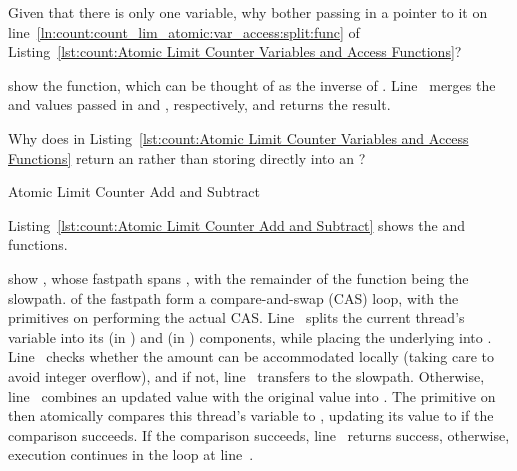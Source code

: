 \QuickQuiz{}
	Given that there is only one  variable,
	why bother passing in a pointer to it on
        line~\ref{ln:count:count_lim_atomic:var_access:split:func} of
	Listing~\ref{lst:count:Atomic Limit Counter Variables and Access Functions}?
 \QuickQuizEnd

\begin{lineref}
 show the  function, which
can be thought of as the inverse of .
Line~ merges the  and 
values passed in  and , respectively, and returns
the result.
\end{lineref}

\QuickQuiz{}
	Why does  in
	Listing~\ref{lst:count:Atomic Limit Counter Variables and Access Functions}
	return an  rather than storing directly into an
	?
 \QuickQuizEnd

\begin{listing}[tbp]

\caption{Atomic Limit Counter Add and Subtract}
\label{lst:count:Atomic Limit Counter Add and Subtract}
\end{listing}

Listing~\ref{lst:count:Atomic Limit Counter Add and Subtract}
shows the  and  functions.

\begin{lineref}
 show , whose fastpath spans
,
with the remainder of the function being the slowpath.
 of the fastpath form a compare-and-swap
(CAS) loop, with
the  primitives on
 performing the
actual CAS.
Line~ splits the current thread's  variable into its
 (in ) and  (in ) components,
while placing the underlying  into .
Line~ checks whether the amount  can be accommodated
locally (taking care to avoid integer overflow), and if not,
line~ transfers to the slowpath.
Otherwise, line~ combines an updated  value with the
original  value into .
The  primitive on
 then atomically
compares this thread's  variable to ,
updating its value to  if the comparison succeeds.
If the comparison succeeds, line~ returns success, otherwise,
execution continues in the loop at line~.
\end{lineref}

